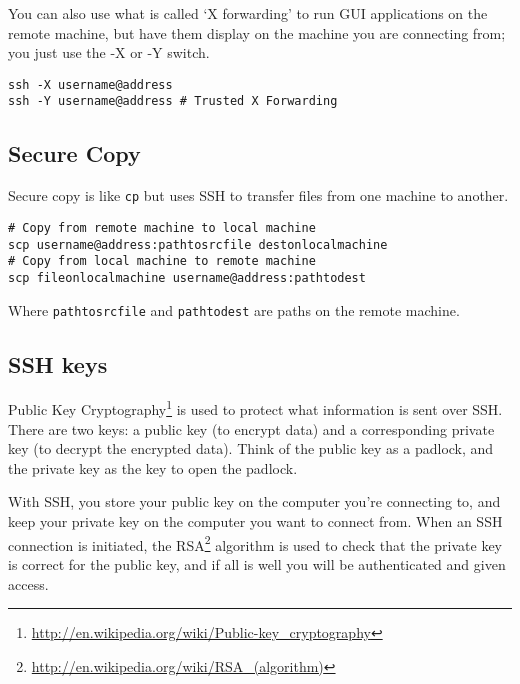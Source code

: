 \documentclass{article}
\begin{document}
You can also use what is called `X forwarding' to run GUI applications on the remote machine, but have them display on the machine you are connecting from; you just use the -X or -Y switch.
\begin{verbatim}
ssh -X username@address
ssh -Y username@address # Trusted X Forwarding
\end{verbatim}
\subsection{Secure Copy}
Secure copy is like \texttt{cp} but uses SSH to transfer files from one machine to another.
\begin{verbatim}
# Copy from remote machine to local machine
scp username@address:pathtosrcfile destonlocalmachine
# Copy from local machine to remote machine
scp fileonlocalmachine username@address:pathtodest
\end{verbatim}
Where \texttt{pathtosrcfile} and \texttt{pathtodest} are paths on the remote machine.

\subsection{SSH keys}
Public Key Cryptography\footnote{\url{http://en.wikipedia.org/wiki/Public-key_cryptography}} is used to protect what information is sent over SSH. There are two keys: a public key (to encrypt data) and a corresponding private key (to decrypt the encrypted data). Think of the public key as a padlock, and the private key as the key to open the padlock. 

With SSH, you store your public key on the computer you're connecting to, and keep your private key on the computer you want to connect from. When an SSH connection is initiated, the RSA\footnote{\url{http://en.wikipedia.org/wiki/RSA_(algorithm)}} algorithm is used to check that the private key is correct for the public key, and if all is well you will be authenticated and given access.
\end{document}
